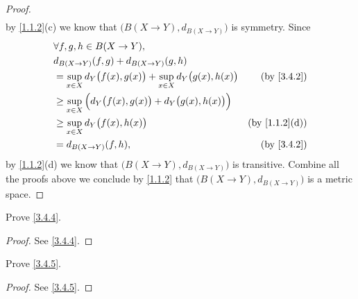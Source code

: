 \begin{proof}
\begin{align*}
  \end{align*}
  by \cref{1.1.2}(c) we know that \(\big(B(X \to Y), d_{B(X \to Y)}\big)\) is symmetry.
  Since
  \begin{align*}
     & \forall f, g, h \in B(X \to Y),                                                                                 \\
     & d_{B(X \to Y)}(f, g) + d_{B(X \to Y)}(g, h)                                                                     \\
     & = \sup_{x \in X} d_Y\big(f(x), g(x)\big) + \sup_{x \in X} d_Y\big(g(x), h(x)\big) & \text{(by \cref{3.4.2})}    \\
     & \geq \sup_{x \in X} \Big(d_Y\big(f(x), g(x)\big) + d_Y\big(g(x), h(x)\big)\Big)                                 \\
     & \geq \sup_{x \in X} d_Y\big(f(x), h(x)\big)                                       & \text{(by \cref{1.1.2}(d))} \\
     & = d_{B(X \to Y)}(f, h),                                                           & \text{(by \cref{3.4.2})}
  \end{align*}
  by \cref{1.1.2}(d) we know that \(\big(B(X \to Y), d_{B(X \to Y)}\big)\) is transitive.
  Combine all the proofs above we conclude by \cref{1.1.2} that \(\big(B(X \to Y), d_{B(X \to Y)}\big)\) is a metric space.
\end{proof}

\begin{exercise}\label{ex 3.4.2}
  Prove \cref{3.4.4}.
\end{exercise}

\begin{proof}
  See \cref{3.4.4}.
\end{proof}

\begin{exercise}\label{ex 3.4.3}
  Prove \cref{3.4.5}.
\end{exercise}

\begin{proof}
  See \cref{3.4.5}.
\end{proof}

